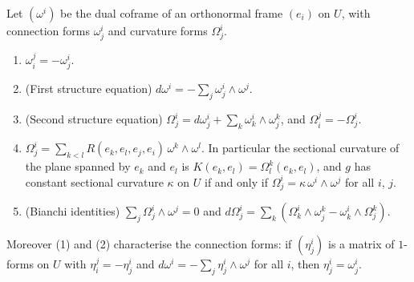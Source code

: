 \begin{theorem}\label{riemannian-geometry:theorem-structure-equations}
Let $(\omega^i)$ be the dual coframe of an orthonormal frame $(e_i)$ on $U$, with connection forms $\omega^i_j$ and curvature forms $\Omega^i_j$.
\begin{enumerate}
\item $\omega^j_i = -\omega^i_j$.
\item (First structure equation) $d\omega^i = -\sum_j\omega^i_j \wedge \omega^j$.
\item (Second structure equation) $\Omega^i_j = d\omega^i_j + \sum_k\omega^i_k \wedge \omega^k_j$, and $\Omega^j_i = -\Omega^i_j$.
\item $\Omega^i_j = \sum_{k < l}R(e_k, e_l, e_j, e_i)\,\omega^k \wedge \omega^l$. In particular the sectional curvature of the plane spanned by $e_k$ and $e_l$ is $K(e_k, e_l) = \Omega^k_l(e_k, e_l)$,
and $g$ has constant sectional curvature $\kappa$ on $U$ if and only if $\Omega^i_j = \kappa\,\omega^i \wedge \omega^j$ for all $i$, $j$.
\item (Bianchi identities) $\sum_j\Omega^i_j \wedge \omega^j = 0$ and $d\Omega^i_j = \sum_k(\Omega^i_k \wedge \omega^k_j - \omega^i_k \wedge \Omega^k_j)$.
\end{enumerate}
Moreover (1) and (2) characterise the connection forms: if $(\eta^i_j)$ is a matrix of $1$-forms on $U$ with $\eta^j_i = -\eta^i_j$ and $d\omega^i = -\sum_j\eta^i_j \wedge \omega^j$ for all $i$,
then $\eta^i_j = \omega^i_j$.
\end{theorem}

